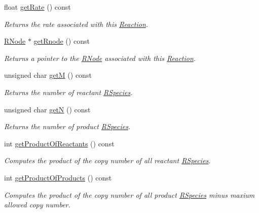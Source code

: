 \begin{DoxyCompactItemize}
float \hyperlink{classchem_1_1Reaction_a4661af0fbf33c822ba8ee530a8498ae7}{get\-Rate} () const 
\begin{DoxyCompactList}\small\item\em Returns the rate associated with this \hyperlink{classchem_1_1Reaction}{Reaction}. \end{DoxyCompactList}\item 
\hyperlink{classchem_1_1RNode}{R\-Node} $\ast$ \hyperlink{classchem_1_1Reaction_af12e3997f13ccb476f7bac45297f4ff9}{get\-Rnode} () const 
\begin{DoxyCompactList}\small\item\em Returns a pointer to the \hyperlink{classchem_1_1RNode}{R\-Node} associated with this \hyperlink{classchem_1_1Reaction}{Reaction}. \end{DoxyCompactList}\item 
unsigned char \hyperlink{classchem_1_1Reaction_a5f420aec9fb36444175089ab16ddb141}{get\-M} () const 
\begin{DoxyCompactList}\small\item\em Returns the number of reactant \hyperlink{classchem_1_1RSpecies}{R\-Species}. \end{DoxyCompactList}\item 
unsigned char \hyperlink{classchem_1_1Reaction_a35c63f46973b5cda157661ab9bffb682}{get\-N} () const 
\begin{DoxyCompactList}\small\item\em Returns the number of product \hyperlink{classchem_1_1RSpecies}{R\-Species}. \end{DoxyCompactList}\item 
int \hyperlink{classchem_1_1Reaction_adffedea2cba0124feda82ef9e3cee5e7}{get\-Product\-Of\-Reactants} () const 
\begin{DoxyCompactList}\small\item\em Computes the product of the copy number of all reactant \hyperlink{classchem_1_1RSpecies}{R\-Species}. \end{DoxyCompactList}\item 
int \hyperlink{classchem_1_1Reaction_aa2dcaea0bc0893a3c00cb3cbcd0a2d6c}{get\-Product\-Of\-Products} () const 
\begin{DoxyCompactList}\small\item\em Computes the product of the copy number of all product \hyperlink{classchem_1_1RSpecies}{R\-Species} minus maxium allowed copy number. \end{DoxyCompactList}\item 

\end{DoxyCompactItemize}

